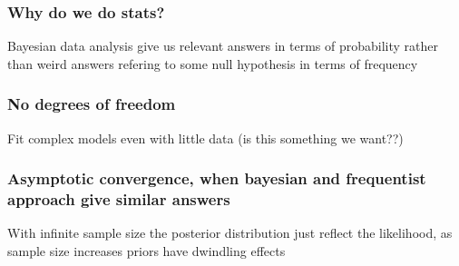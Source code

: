 \documentclass{beamer}
\begin{document}
 
  \begin{frame}
  \frametitle{\bf Why do we do stats?}
  
  Bayesian data analysis give us relevant answers in terms of probability rather than weird answers refering to some null hypothesis in
  terms of frequency
  
 \end{frame}
 
  \begin{frame}
  \frametitle{\bf No degrees of freedom}
  
  Fit complex models even with little data (is this something we want??)
  
 \end{frame}
 
  \begin{frame}
  \frametitle{\bf Asymptotic convergence, when bayesian and frequentist approach give similar answers}
  
  With infinite sample size the posterior distribution just reflect the likelihood, as sample size increases
  priors have dwindling effects
  
 \end{frame}
 
\end{document}
